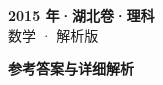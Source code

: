 \documentclass[zihao=-4, a4paper]{ctexart}
\begin{document}
\begin{center}
  {\Large\bfseries 2015 年·湖北卷·理科}\\[4pt]
  {\large 数学 · 解析版}
\end{center}
\medskip
{}

\clearpage
{}
\begin{center}{\Large\bfseries 参考答案与详细解析}\end{center}
\medskip

\end{document}
